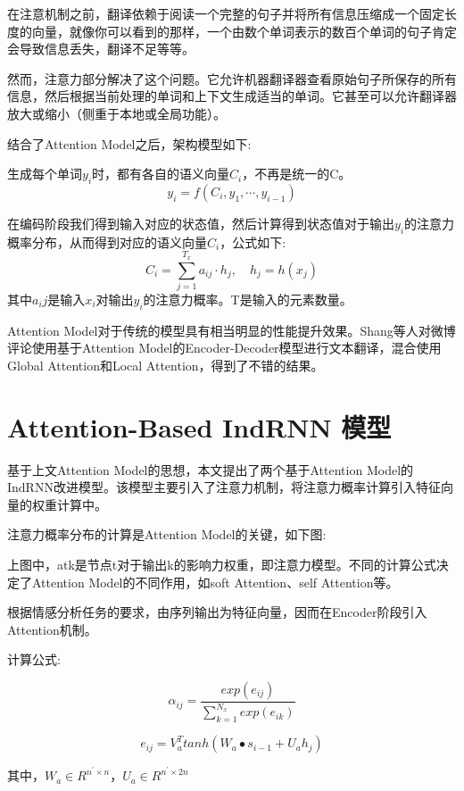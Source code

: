 \documentclass[a4paper,AutoFakeBold,oneside,12pt]{book}
\begin{document}
在注意机制之前，翻译依赖于阅读一个完整的句子并将所有信息压缩成一个固定长度的向量，就像你可以看到的那样，一个由数个单词表示的数百个单词的句子肯定会导致信息丢失，翻译不足等等。

然而，注意力部分解决了这个问题。它允许机器翻译器查看原始句子所保存的所有信息，然后根据当前处理的单词和上下文生成适当的单词。它甚至可以允许翻译器放大或缩小（侧重于本地或全局功能）。

结合了Attention Model之后，架构模型如下:


生成每个单词$y_i$时，都有各自的语义向量$C_i$，不再是统一的C。
$$y_i = f(C_i, y_1, \cdots, y_{i-1})$$

在编码阶段我们得到输入对应的状态值，然后计算得到状态值对于输出$y_i$的注意力概率分布，从而得到对应的语义向量$C_i$，公式如下:
$$C_i  = \sum_{j=1}^{T_x} a_{ij} \cdot h_j, \quad h_j = h(x_j)$$
其中$a_ij$是输入$x_i$对输出$y_i$的注意力概率。T是输入的元素数量。

Attention Model对于传统的模型具有相当明显的性能提升效果。Shang等人对微博评论使用基于Attention Model的Encoder-Decoder模型进行文本翻译，混合使用Global Attention和Local Attention，得到了不错的结果\cite{shangNeuralRespondingMachine2015}。

\section{Attention-Based IndRNN 模型}
基于上文Attention Model的思想，本文提出了两个基于Attention Model的IndRNN改进模型。该模型主要引入了注意力机制，将注意力概率计算引入特征向量的权重计算中。

注意力概率分布的计算是Attention Model的关键，如下图:


上图中，atk是节点t对于输出k的影响力权重，即注意力模型。不同的计算公式决定了Attention Model的不同作用，如soft Attention、self Attention等。

根据情感分析任务的要求，由序列输出为特征向量，因而在Encoder阶段引入Attention机制。

计算公式:

$$α_{ij}=\frac{exp(e_{ij})}{∑_{k=1}^{N_x}exp(e_{ik})}$$

$$e_{ij}=V_a^T tanh(W_a \bullet s_{i-1}+U_a h_j )$$

其中，$W_a \in R^{n^\prime×n}$，$U_a \in R^{n^\prime×2n}$
\end{document}
